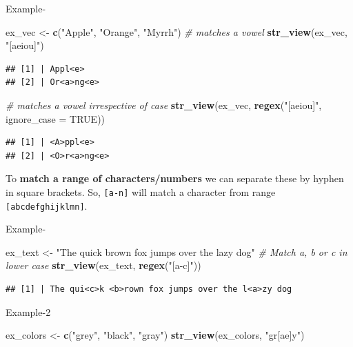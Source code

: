 \documentclass[
]{book}
\newenvironment{Shaded}{\begin{snugshade}}{\end{snugshade}}
\newcommand{\AttributeTok}[1]{\textcolor[rgb]{0.13,0.29,0.53}{#1}}
\newcommand{\CommentTok}[1]{\textcolor[rgb]{0.56,0.35,0.01}{\textit{#1}}}
\newcommand{\ConstantTok}[1]{\textcolor[rgb]{0.56,0.35,0.01}{#1}}
\newcommand{\FunctionTok}[1]{\textcolor[rgb]{0.13,0.29,0.53}{\textbf{#1}}}
\newcommand{\NormalTok}[1]{#1}
\newcommand{\OtherTok}[1]{\textcolor[rgb]{0.56,0.35,0.01}{#1}}
\newcommand{\StringTok}[1]{\textcolor[rgb]{0.31,0.60,0.02}{#1}}
\begin{document}
Example-

\begin{Shaded}
\begin{Highlighting}[]
\NormalTok{ex\_vec }\OtherTok{\textless{}{-}} \FunctionTok{c}\NormalTok{(}\StringTok{"Apple"}\NormalTok{, }\StringTok{"Orange"}\NormalTok{, }\StringTok{"Myrrh"}\NormalTok{)}
\CommentTok{\# matches a vowel}
\FunctionTok{str\_view}\NormalTok{(ex\_vec, }\StringTok{"[aeiou]"}\NormalTok{)}
\end{Highlighting}
\end{Shaded}

\begin{verbatim}
## [1] | Appl<e>
## [2] | Or<a>ng<e>
\end{verbatim}

\begin{Shaded}
\begin{Highlighting}[]
\CommentTok{\# matches a vowel irrespective of case}
\FunctionTok{str\_view}\NormalTok{(ex\_vec, }\FunctionTok{regex}\NormalTok{(}\StringTok{"[aeiou]"}\NormalTok{, }\AttributeTok{ignore\_case =} \ConstantTok{TRUE}\NormalTok{))}
\end{Highlighting}
\end{Shaded}

\begin{verbatim}
## [1] | <A>ppl<e>
## [2] | <O>r<a>ng<e>
\end{verbatim}

To \textbf{match a range of characters/numbers} we can separate these by hyphen in square brackets. So, \texttt{{[}a-n{]}} will match a character from range \texttt{{[}abcdefghijklmn{]}}.

Example-

\begin{Shaded}
\begin{Highlighting}[]
\NormalTok{ex\_text }\OtherTok{\textless{}{-}} \StringTok{"The quick brown fox jumps over the lazy dog"}
\CommentTok{\# Match a, b or c in lower case}
\FunctionTok{str\_view}\NormalTok{(ex\_text, }\FunctionTok{regex}\NormalTok{(}\StringTok{"[a{-}c]"}\NormalTok{))}
\end{Highlighting}
\end{Shaded}

\begin{verbatim}
## [1] | The qui<c>k <b>rown fox jumps over the l<a>zy dog
\end{verbatim}

Example-2

\begin{Shaded}
\begin{Highlighting}[]
\NormalTok{ex\_colors }\OtherTok{\textless{}{-}} \FunctionTok{c}\NormalTok{(}\StringTok{"grey"}\NormalTok{, }\StringTok{"black"}\NormalTok{, }\StringTok{"gray"}\NormalTok{)}
\FunctionTok{str\_view}\NormalTok{(ex\_colors, }\StringTok{"gr[ae]y"}\NormalTok{)}
\end{Highlighting}
\end{Shaded}
\end{document}
